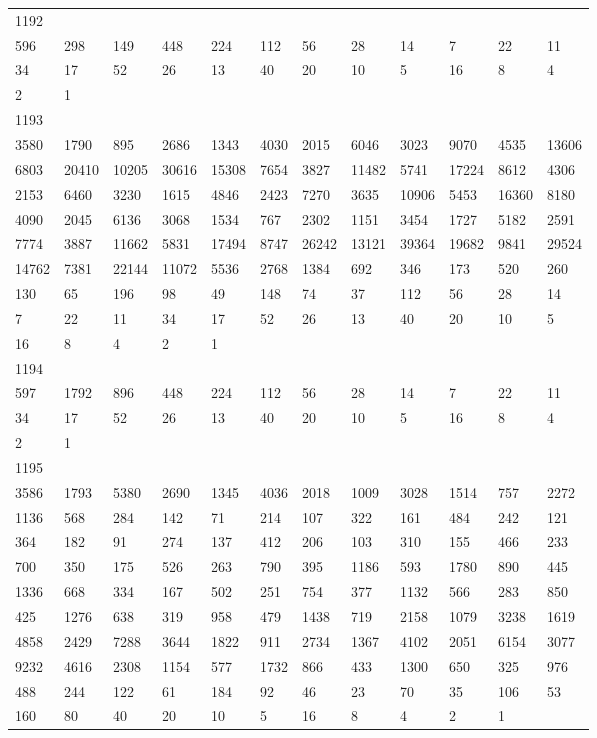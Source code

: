 \begin{longtable}{llllllllllll}
1192&&&&&&&&&&&\\
596& 298& 149& 448& 224& 112& 56& 28& 14& 7& 22& 11\\
34& 17& 52& 26& 13& 40& 20& 10& 5& 16& 8& 4\\
2& 1& \\

1193&&&&&&&&&&&\\
3580& 1790& 895& 2686& 1343& 4030& 2015& 6046& 3023& 9070& 4535& 13606\\
6803& 20410& 10205& 30616& 15308& 7654& 3827& 11482& 5741& 17224& 8612& 4306\\
2153& 6460& 3230& 1615& 4846& 2423& 7270& 3635& 10906& 5453& 16360& 8180\\
4090& 2045& 6136& 3068& 1534& 767& 2302& 1151& 3454& 1727& 5182& 2591\\
7774& 3887& 11662& 5831& 17494& 8747& 26242& 13121& 39364& 19682& 9841& 29524\\
14762& 7381& 22144& 11072& 5536& 2768& 1384& 692& 346& 173& 520& 260\\
130& 65& 196& 98& 49& 148& 74& 37& 112& 56& 28& 14\\
7& 22& 11& 34& 17& 52& 26& 13& 40& 20& 10& 5\\
16& 8& 4& 2& 1& \\

1194&&&&&&&&&&&\\
597& 1792& 896& 448& 224& 112& 56& 28& 14& 7& 22& 11\\
34& 17& 52& 26& 13& 40& 20& 10& 5& 16& 8& 4\\
2& 1& \\

1195&&&&&&&&&&&\\
3586& 1793& 5380& 2690& 1345& 4036& 2018& 1009& 3028& 1514& 757& 2272\\
1136& 568& 284& 142& 71& 214& 107& 322& 161& 484& 242& 121\\
364& 182& 91& 274& 137& 412& 206& 103& 310& 155& 466& 233\\
700& 350& 175& 526& 263& 790& 395& 1186& 593& 1780& 890& 445\\
1336& 668& 334& 167& 502& 251& 754& 377& 1132& 566& 283& 850\\
425& 1276& 638& 319& 958& 479& 1438& 719& 2158& 1079& 3238& 1619\\
4858& 2429& 7288& 3644& 1822& 911& 2734& 1367& 4102& 2051& 6154& 3077\\
9232& 4616& 2308& 1154& 577& 1732& 866& 433& 1300& 650& 325& 976\\
488& 244& 122& 61& 184& 92& 46& 23& 70& 35& 106& 53\\
160& 80& 40& 20& 10& 5& 16& 8& 4& 2& 1& \\


\end{longtable}
